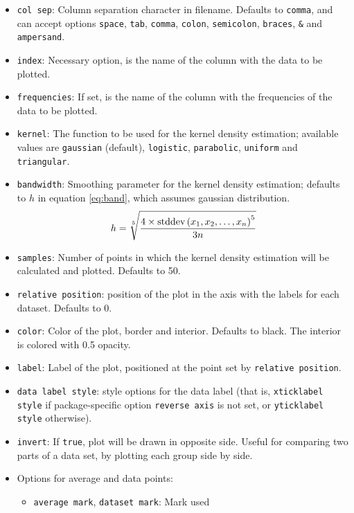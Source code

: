 \documentclass{article}
\begin{document}
\begin{itemize}
	\item \texttt{col sep}: Column separation character in filename.
		Defaults to \texttt{comma}, and can accept options
		\texttt{space}, \texttt{tab}, \texttt{comma},
		\texttt{colon}, \texttt{semicolon}, \texttt{braces},
		\texttt{\&} and \texttt{ampersand}.
	\item \texttt{index}: Necessary option, is the name of the column with
		the data to be plotted.
	\item \texttt{frequencies}: If set, is the name of the column with
		the frequencies of the data to be plotted.
	\item \texttt{kernel}: The function to be used for the kernel density
		estimation; available values are \texttt{gaussian} (default),
		\texttt{logistic}, \texttt{parabolic}, \texttt{uniform}
		and \texttt{triangular}.
	\item \texttt{bandwidth}: Smoothing parameter for the kernel density
		estimation; defaults to $h$ in equation \ref{eq:band},
		which assumes gaussian distribution.
		\begin{equation}
			\label{eq:band}
			h=\sqrt[5]{\frac{4\times\textnormal{stddev}%
			\left(x_1,x_2,\ldots,x_n\right)^5}{3n}}
		\end{equation}
	\item \texttt{samples}: Number of points in which the kernel density
		estimation will be calculated and plotted. Defaults
		to 50.
	\item \texttt{relative position}: position of the plot in the axis
		with the labels for each dataset. Defaults to 0.
	\item \texttt{color}: Color of the plot, border and interior.
		Defaults to black. The interior is colored with 0.5
		opacity.
	\item \texttt{label}: Label of the plot, positioned at the point
		set by \texttt{relative position}.
	\item \texttt{data label style}: style options for the data label (that
		is, \texttt{xticklabel style} if package-specific option
		\texttt{reverse axis} is not set, or \texttt{yticklabel style}
		otherwise).
	\item \texttt{invert}: If \texttt{true}, plot will be drawn in opposite
		side. Useful for comparing two parts of a data set, by plotting each
		group side by side.
	\item Options for average and data points:
	\begin{itemize}
		\item \texttt{average mark}, \texttt{dataset mark}: Mark used

\end{itemize}
\end{itemize}
\end{document}
